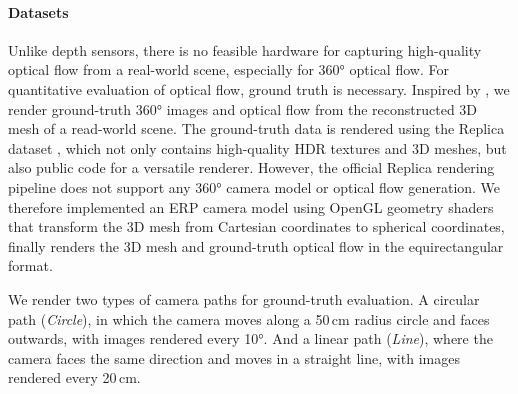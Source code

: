 \paragraph{Datasets}
%
%
%
Unlike depth sensors, %
there is no feasible hardware for capturing high-quality optical flow from a real-world scene, especially for 360° optical flow.
%
For quantitative evaluation of optical flow, ground truth is necessary.
%
Inspired by \citet{shugrina2019creative}, we render ground-truth 360° images and optical flow from the reconstructed 3D mesh of a read-world scene.
The ground-truth data is rendered using the Replica dataset \cite{StrauWMCWGEMRVCYBYPYZLCBGMPSBSNGLN2019}, which not only contains high-quality HDR textures and 3D meshes, but also public code for a versatile renderer.
%
However, the official Replica rendering pipeline does not support any 360° camera model or optical flow generation.
We therefore implemented an ERP camera model using OpenGL geometry shaders that transform the 3D mesh from Cartesian coordinates to spherical coordinates, finally renders the 3D mesh and ground-truth optical flow in the equirectangular format.


We render two types of camera paths for ground-truth evaluation.
A circular path (\emph{Circle}), in which the camera moves along a 50\,cm radius circle and faces outwards, with images rendered every 10°.
And a linear path (\emph{Line}), where the camera faces the same direction and moves in a straight line, with images rendered every 20\,cm.


